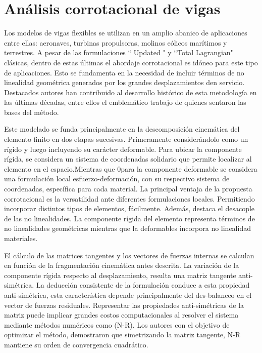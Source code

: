 \section{Análisis corrotacional de vigas}\label{Sec:EA:Corrotacional}
Los modelos de vigas flexibles se utilizan en un amplio abanico de aplicaciones entre ellas: aeronaves, turbinas propulsoras, molinos eólicos marítimos y terrestres. A pesar de las formulaciones `` Updated " y ``Total Lagrangian" clásicas,  dentro de estas últimas el abordaje corrotacional es idóneo para este tipo de aplicaciones. Esto se fundamenta en la necesidad de incluir términos de no linealidad geométrica generados por los grandes desplazamientos den servicio. Destacados autores han contribuido al desarrollo histórico de esta metodología en las últimas décadas, entre ellos el emblemático trabajo de \cite{Nour-Omid1991} quienes sentaron las bases del método. 

Este modelado se funda principalmente en la descomposición cinemática del elemento finito en dos etapas sucesivas. Primeramente considerándolo como un rígido y luego incluyendo su carácter deformable. Para ubicar la componente rígida, se considera un sistema de coordenadas solidario que permite localizar al elemento en el espacio.Mientras que 0para la componente deformable se considera una formulación local esfuerzo-deformación, con su respectivo sistema de coordenadas, específica para cada material. La principal ventaja de la propuesta corrotacional es la versatilidad ante diferentes formulaciones locales. Permitiendo incorporar distintos tipos de elementos, fácilmente. Además, destaca el desacople de las no linealidades. La componente rígida del elemento representa términos de no linealidades geométricas mientras que la deformables incorpora no linealidad materiales. 

El cálculo de las matrices tangentes y los vectores de fuerzas internas se calculan en función de la fragmentación cinemática antes descrita. La variación de la componente rígida respecto al desplazamiento, resulta una matriz tangente anti-simétrica. La deducción consistente de la formulación conduce a esta propiedad anti-simétrica, esta característica depende principalmente del des-balanceo en el vector de fuerzas residuales. Representar las propiedades anti-simétricas de la matriz puede implicar grandes costos computacionales al resolver el sistema mediante métodos numéricos como (\gls{N-R}). Los autores \cite{Nour-Omid1991} con el objetivo de optimizar el método, demostraron que simetrizando la matriz tangente, N-R mantiene su orden de convergencia cuadrático.

